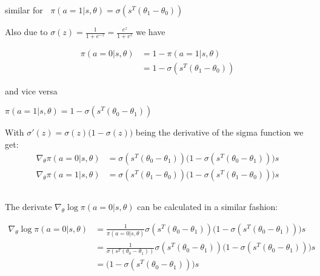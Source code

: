 \documentclass[11pt,a4paper]{article}
\begin{document}
similar for $\;\; \pi(a=1|s,\theta) =  \sigma(s^{T}(\theta_{1} - \theta_{0}))$

\vspace{5pt}

Also due to $\sigma(z) = \frac{1}{1+e^{-z}} = \frac{e^{z}}{1+e^{z}}$ we have

\begin{align*}
  \pi(a=0|s,\theta) &= 1 - \pi(a=1|s,\theta) \\
                    &= 1 - \sigma(s^{T}(\theta_{1} - \theta_{0}))
\end{align*}
  
and vice versa

\begin{center}
  $\pi(a=1|s,\theta) = 1 - \sigma(s^{T}(\theta_{0} - \theta_{1}))$
\end{center}

\vspace{5pt}

With $\sigma'(z) = \sigma(z) \bigl( 1 - \sigma(z) \bigr)$ being the derivative of the sigma function we get: \\

\begin{align*}
  \nabla_{\theta} \pi(a=0|s,\theta) &= \sigma(s^{T}(\theta_{0} - \theta_{1})) \bigl( 1 -  \sigma(s^{T}(\theta_{0} - \theta_{1})) \bigr)s \\
  \nabla_{\theta} \pi(a=1|s,\theta) &= \sigma(s^{T}(\theta_{1} - \theta_{0})) \bigl( 1 -  \sigma(s^{T}(\theta_{1} - \theta_{0})) \bigr)s
\end{align*}


\subsection{}

The derivate $\nabla_{\theta} \log \pi(a=0|s,\theta)$ can be calculated in a similar fashion:


\begin{align*}
  \nabla_{\theta} \log \pi(a=0|s,\theta) &= \frac{1}{\pi(a=0|s,\theta)} 
                  \sigma(s^{T}(\theta_{0} - \theta_{1})) \bigl( 1 -  \sigma(s^{T}(\theta_{0} - \theta_{1})) \bigr)s \\
  &= \frac{1}{\sigma(s^{T}(\theta_{0} - \theta_{1}))} 
  \sigma(s^{T}(\theta_{0} - \theta_{1})) \bigl( 1 -  \sigma(s^{T}(\theta_{0} - \theta_{1})) \bigr)s \\
  &= \bigl( 1 -  \sigma(s^{T}(\theta_{0} - \theta_{1})) \bigr)s \\
\end{align*}
\end{document}

